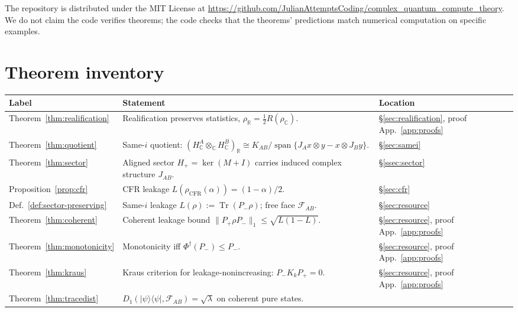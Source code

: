 \documentclass[a4paper,onecolumn,noarxiv]{quantumarticle}
\theoremstyle{plain}
\theoremstyle{definition}
\theoremstyle{remark}
\newcommand{\R}{\mathbb{R}}
\newcommand{\C}{\mathbb{C}}
\newcommand{\HC}{H_{\C}}
\newcommand{\KAB}{K_{AB}}
\newcommand{\Pplus}{P_{+}}
\newcommand{\Pminus}{P_{-}}
\newcommand{\Hplus}{H_{+}}
\newcommand{\Mop}{M}
\newcommand{\JAB}{J_{AB}}
\newcommand{\FAB}{\mathcal{F}_{AB}}
\newcommand{\Tr}{\operatorname{Tr}}
\newcommand{\Phid}{\Phi^{\dagger}}
\newcommand{\Lleak}{L}
\begin{document}
The repository is distributed under the MIT License at
\url{https://github.com/JulianAttemptsCoding/complex_quantum_compute_theory}.
We do not claim the code verifies theorems; the code checks that the theorems'
predictions match numerical computation on specific examples.




\appendix

\section{Theorem inventory}
\label{app:inventory}

\begin{center}
\renewcommand{\arraystretch}{1.25}
\begin{tabular}{@{}lll@{}}
\toprule
Label & Statement & Location \\
\midrule
Theorem~\ref{thm:realification}
  & Realification preserves statistics, $\rho_\R=\tfrac{1}{2}R(\rho_\C)$.
  & \S\ref{sec:realification}, proof App.~\ref{app:proofs} \\
Theorem~\ref{thm:quotient}
  & Same-$i$ quotient: $(\HC^A\otimes_\C\HC^B)_\R\cong\KAB/\operatorname{span}\{J_Ax\otimes y-x\otimes J_By\}$.
  & \S\ref{sec:samei} \\
Theorem~\ref{thm:sector}
  & Aligned sector $\Hplus=\ker(\Mop+I)$ carries induced complex structure $\JAB$.
  & \S\ref{ssec:sector} \\
Proposition~\ref{prop:cfr}
  & CFR leakage $\Lleak(\rho_{\mathrm{CFR}}(\alpha))=(1-\alpha)/2$.
  & \S\ref{sec:cfr} \\
Def.~\ref{def:sector-preserving}
  & Same-$i$ leakage $\Lleak(\rho):=\Tr(\Pminus\rho)$; free face $\FAB$.
  & \S\ref{sec:resource} \\
Theorem~\ref{thm:coherent}
  & Coherent leakage bound $\|\Pplus\rho\Pminus\|_1\le\sqrt{\Lleak(1-\Lleak)}$.
  & \S\ref{sec:resource}, proof App.~\ref{app:proofs} \\
Theorem~\ref{thm:monotonicity}
  & Monotonicity iff $\Phid(\Pminus)\le\Pminus$.
  & \S\ref{sec:resource}, proof App.~\ref{app:proofs} \\
Theorem~\ref{thm:kraus}
  & Kraus criterion for leakage-nonincreasing: $\Pminus K_k\Pplus=0$.
  & \S\ref{sec:resource}, proof App.~\ref{app:proofs} \\
Theorem~\ref{thm:tracedist}
  & $D_1(|\psi\rangle\langle\psi|,\FAB)=\sqrt{\lambda}$ on coherent pure states.

\end{tabular}
\end{center}
\end{document}

